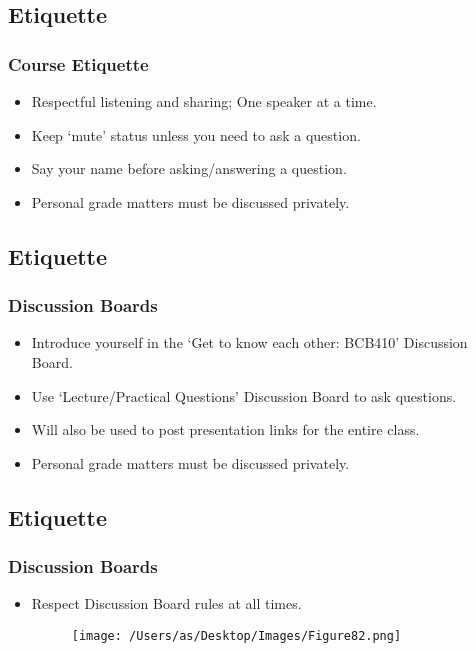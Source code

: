 \documentclass[11pt]{beamer}
\begin{document}
\subsection{Etiquette}
\begin{frame}
\frametitle{Course Etiquette}
\begin{itemize}
\vspace{0.2in}
\item Respectful listening and sharing; One speaker at a time.
\vspace{0.2in}
\item Keep `mute' status unless you need to ask a question. 
\vspace{0.2in}
\item Say your name before asking/answering a question. 
\vspace{0.2in}
\item Personal grade matters must be discussed privately. 
\end{itemize}
\end{frame}




\subsection{Etiquette}
\begin{frame}
\frametitle{Discussion Boards}
\begin{itemize}
\vspace{0.2in}
\item Introduce yourself in the `Get to know each other: BCB410' Discussion Board.
\vspace{0.2in}
\item Use `Lecture/Practical Questions' Discussion Board to ask questions.
\vspace{0.2in}
\item Will also be used to post presentation links for the entire class. 
\vspace{0.2in}
\item Personal grade matters must be discussed privately. 
\end{itemize}
\end{frame}



\subsection{Etiquette}
\begin{frame}
\frametitle{Discussion Boards}
\begin{itemize}
\vspace{0.2in}
\item Respect Discussion Board rules at all times. 
\vspace{0.2in}
\begin{center}
\begin{figure}
\texttt{[image: /Users/as/Desktop/Images/Figure82.png]}
\end{figure}
\end{center} 
\end{itemize}
\end{frame}
\end{document}
